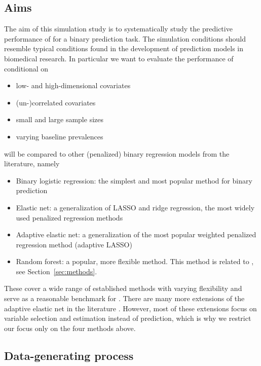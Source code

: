 \subsection{Aims} \label{sec:aims}

The aim of this simulation study is to systematically study the predictive
performance of \ainet{} for a binary prediction task. The simulation conditions
should resemble typical conditions found in the development of prediction models
in biomedical research. In particular we want to evaluate the performance of
\ainet{} conditional on
\begin{itemize}
  \item low- and high-dimensional covariates
  \item (un-)correlated covariates
  \item small and large sample sizes
  \item varying baseline prevalences
\end{itemize}
\ainet{} will be compared to other (penalized) binary regression models
from the literature, namely
\begin{itemize}
  \item Binary logistic regression: the simplest and most popular method for
        binary prediction
  \item Elastic net: a generalization of LASSO and ridge regression, the most
        widely used penalized regression methods
  \item Adaptive elastic net: a generalization of the most popular weighted 
  penalized regression method (adaptive LASSO)
  \item Random forest: a popular, more flexible method. This method is related to
        \ainet{}, see Section~\ref{sec:methods}.
\end{itemize}
These cover a wide range of established methods with varying flexibility and
serve as a reasonable benchmark for \ainet. There are many more extensions of
the adaptive elastic net in the literature \citep[see \eg{} the review by][]{Vidaurre2013}.
However, most of these extensions focus on variable selection and
estimation instead of prediction, which is why we restrict our focus only on the
four methods above.

\subsection{Data-generating process} \label{sec:dgp}

